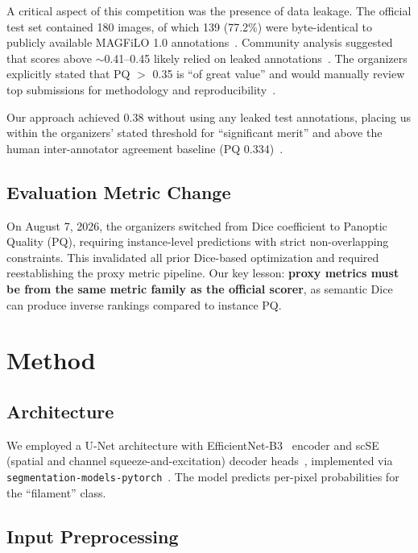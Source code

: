 \documentclass[conference]{IEEEtran}
\begin{document}
A critical aspect of this competition was the presence of data leakage. The official test set contained 180 images, of which 139 (77.2\%) were byte-identical to publicly available MAGFiLO 1.0 annotations~\cite{magfilo}. Community analysis suggested that scores above $\sim$0.41--0.45 likely relied on leaked annotations~\cite{discussion741892}. The organizers explicitly stated that PQ $>$ 0.35 is ``of great value'' and would manually review top submissions for methodology and reproducibility~\cite{discussion724503}.

Our approach achieved 0.38 without using any leaked test annotations, placing us within the organizers' stated threshold for ``significant merit'' and above the human inter-annotator agreement baseline (PQ 0.334)~\cite{argoha2026}.

\subsection{Evaluation Metric Change}

On August 7, 2026, the organizers switched from Dice coefficient to Panoptic Quality (PQ), requiring instance-level predictions with strict non-overlapping constraints. This invalidated all prior Dice-based optimization and required reestablishing the proxy metric pipeline. Our key lesson: \textbf{proxy metrics must be from the same metric family as the official scorer}, as semantic Dice can produce inverse rankings compared to instance PQ.

\section{Method}

\subsection{Architecture}

We employed a U-Net architecture with EfficientNet-B3~\cite{tan2019efficientnet} encoder and scSE (spatial and channel squeeze-and-excitation) decoder heads~\cite{roy2018concurrent}, implemented via \texttt{segmentation-models-pytorch}~\cite{iakubovskii2019segmentation}. The model predicts per-pixel probabilities for the ``filament'' class.

\subsection{Input Preprocessing}
\end{document}
